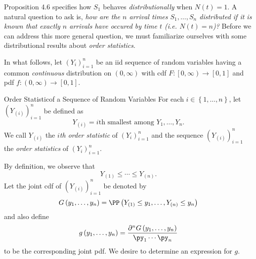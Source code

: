 \documentclass[stat333]{subfiles}
\begin{document}
    Proposition 4.6 specifies how $S_1$ behaves \textit{distributionally} when $N\left( t \right)=1$. A natural question to ask is, \textit{how are the $n$ arrival times $S_1,\ldots,S_n$ distributed if it is known that exactly $n$ arrivals have occured by time $t$ (i.e. $N\left( t \right)=n$)?} Before we can address this more general question, we must familiarize ourselves with some distributional results about \textit{order statistics}.

    In what follows, let $\left( Y_{i} \right)^{n}_{i=1}$ be an iid sequence of random variables having a common \textit{continuous} distribution on $\left( 0,\infty \right)$ with cdf $F:\left[ 0,\infty \right)\to\left[ 0,1 \right]$ and pdf $f:\left( 0,\infty \right)\to\left[ 0,1 \right]$.

    \begin{recall}{Order Statistic}{of a Sequence of Random Variables}
        For each $i\in\left\lbrace 1,\ldots,n \right\rbrace$, let $\left( Y_{\left( i \right)} \right)^{n}_{i=1}$ be defined as
        \begin{equation*}
            Y_{\left( i \right)} = \text{$i$th smallest among $Y_1,\ldots,Y_n$}.
        \end{equation*}
        We call $Y_{\left( i \right)}$ the \emph{$i$th order statistic} of $\left( Y_{i} \right)^{n}_{i=1}$ and the sequence $\left( Y_{\left( i \right)} \right)^{n}_{i=1}$ the \emph{order statistics} of $\left( Y_{i} \right)^{n}_{i=1}$.
    \end{recall}

    \noindent By definition, we observe that
    \begin{equation*}
        Y_{\left( 1 \right)}\leq \cdots\leq Y_{\left( n \right)}.
    \end{equation*}
    Let the joint cdf of $\left( Y_{\left( i \right)} \right)^{n}_{i=1}$ be denoted by
    \begin{equation*}
        G\left( y_1,\ldots,y_n \right) = \PP\left( Y_{\left( 1 \right)}\leq y_1,\ldots,Y_{\left( n \right)}\leq y_n \right)
    \end{equation*}
    and also define
    \begin{equation*}
        g\left( y_1,\ldots,y_n \right) = \frac{\partial^n G\left( y_1,\ldots,y_n \right)}{\py_1\cdots\py_n}
    \end{equation*}
    to be the corresponding joint pdf. We desire to determine an expression for $g$.
\end{document}
